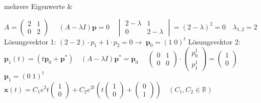 mehrere Eigenwerte & 

$A = \begin{pmatrix} 2&1\\0&2 \end{pmatrix} \quad$
$(A-\lambda I)\bm p = 0 \quad \begin{vmatrix} 2-\lambda&1\\0&2-\lambda \end{vmatrix}=(2-\lambda)^2 = 0 \quad \lambda_{1,2} = 2$\newline
Lösungsvektor 1: $ (2-2)\cdot p_1 + 1\cdot p_2 =0\rightarrow\; \bm p_0 = (1 \;0)^t$\newline 
Lösungsvektor 2: $\bm p_1(t) = (t\bm p_0 + \bm p^*) \quad (A-\lambda I)\bm p^* = \bm p_0 \quad $
$\begin{pmatrix} 0&1\\0&0\end{pmatrix}\cdot \begin{pmatrix} p_0^1\\p_1^1\end{pmatrix} = \begin{pmatrix} 1\\0\end{pmatrix}$\newline  
$\bm p_1 = (0\; 1)^t \qquad \qquad$ 
$\bm x(t) = C_1 e^2t \begin{pmatrix} 1\\0\end{pmatrix} + C_2e^{2t} \left(t \begin{pmatrix} 1\\0\end{pmatrix} + \begin{pmatrix} 0\\1\end{pmatrix}\right) \quad (C_1,C_2\in \mathbb R)$\\